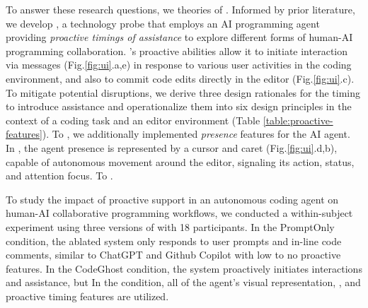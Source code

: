 To answer these research questions, 
we  theories of .
Informed by prior literature, we develop \sys{}, a technology probe \cite{hutchinson2003techprobe} that employs an AI programming agent providing \emph{proactive timings of assistance} to explore different forms of human-AI programming collaboration.
\sys{}'s proactive abilities allow it to initiate interaction via messages (Fig.\ref{fig:ui}.a,e) in response to various user activities in the coding environment, and also to commit code edits directly in the editor (Fig.\ref{fig:ui}.c). 
To mitigate potential disruptions, we derive three design rationales for the timing to introduce assistance and operationalize them into six design principles in the context of a coding task and an editor environment (Table \ref{table:proactive-features}).
To , we additionally implemented \textit{presence} features for the AI agent. 
In \sys{}, the agent presence is represented by a cursor and caret (Fig.\ref{fig:ui}.d,b), capable of autonomous movement around the editor, signaling its action, status, and attention focus. 
To . 

To study the impact of proactive support in an autonomous coding agent on human-AI collaborative programming workflows, we conducted a within-subject experiment using three versions of \sys{} with 18 participants.
In the PromptOnly condition, the ablated system only responds to user prompts and in-line code comments, similar to ChatGPT \cite{chatgpt} and Github Copilot \cite{githubcopilot} with low to no proactive features. 
In the CodeGhost condition, the system proactively initiates interactions and assistance, but  
In the \sys{} condition, all of the agent's visual representation, , and proactive timing features are utilized. 


